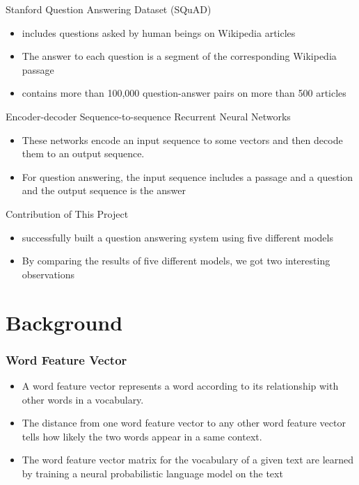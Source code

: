 \documentclass{beamer}
\begin{document}
\begin{frame}{Stanford Question Answering Dataset (SQuAD)}
    \begin{itemize}
        \item includes questions asked by human beings on Wikipedia articles
        \item The answer to each question is a segment of the corresponding Wikipedia passage
        \item contains more than 100,000 question-answer pairs on more than 500 articles
    \end{itemize}
\end{frame}
\begin{frame}{Encoder-decoder Sequence-to-sequence Recurrent Neural Networks}
   \begin{itemize}
       \item These networks encode an input sequence to some vectors and then decode them to an output sequence. \item For question answering, the input sequence includes a passage and a question and the output sequence is the answer
   \end{itemize}
\end{frame}

\begin{frame}{Contribution of This Project}
    \begin{itemize}
        \item successfully built a question answering system using five different models
        \item By comparing the results of five different models, we got two interesting observations
    \end{itemize}
\end{frame}

\section{Background}

\begin{frame} \frametitle{Word Feature Vector}
  \begin{itemize}
      \item A word feature vector represents a word according to its relationship with other words in a vocabulary.
      \item The distance from one word feature vector to any other word feature vector tells how likely the two words appear in a same context.
      \item The word feature vector matrix for the vocabulary of a given text are learned by training a neural probabilistic language model on the text

  \end{itemize}
\end{frame}
\end{document}
